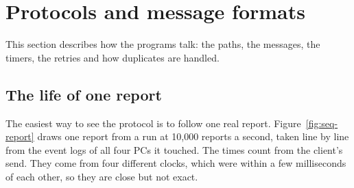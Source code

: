 \section{Protocols and message formats}
\label{sec:proto}

This section describes how the programs talk: the paths, the messages, the timers, the retries and how duplicates are handled.

\subsection{The life of one report}

The easiest way to see the protocol is to follow one real report. Figure~\ref{fig:seq-report} draws one report from a run at 10,000 reports a second, taken line by line from the event logs of all four PCs it touched. The times count from the client's send. They come from four different clocks, which were within a few milliseconds of each other, so they are close but not exact.


